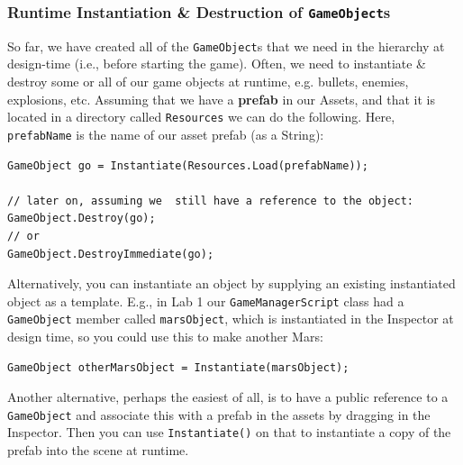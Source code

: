 \documentclass[a4paper,11pt]{article}
\begin{document}
\subsubsection{Runtime Instantiation \& Destruction of \texttt{GameObject}s}
So far, we have created all of the \verb|GameObject|s that we need in the hierarchy at design-time (i.e., before starting the
game).
Often, we need to instantiate \& destroy some or all of our game objects at runtime, e.g. bullets, enemies, explosions, etc. 
Assuming that we have a \textbf{prefab} in our Assets, and that it is located in a directory called \verb|Resources| we can 
do the following.
Here, \verb|prefabName| is the name of our asset prefab (as a String):
\begin{verbatim}
GameObject go = Instantiate(Resources.Load(prefabName));

// later on, assuming we  still have a reference to the object:
GameObject.Destroy(go);
// or 
GameObject.DestroyImmediate(go);
\end{verbatim}

Alternatively, you can instantiate an object by supplying an existing instantiated object as a template. 
E.g., in Lab 1 our \verb|GameManagerScript| class had a \verb|GameObject| member called \verb|marsObject|, which is 
instantiated in the Inspector at design time, so you could use this to make another Mars:
\begin{verbatim}
GameObject otherMarsObject = Instantiate(marsObject);
\end{verbatim}

Another alternative, perhaps the easiest of all, is to have a public reference to a \verb|GameObject| and associate this
with a prefab in the assets by dragging in the Inspector. 
Then you can use \verb|Instantiate()| on that to instantiate a copy of the prefab into the scene at runtime.
\end{document}
